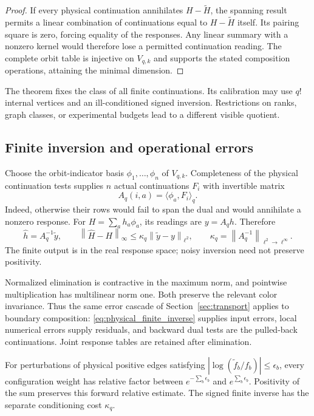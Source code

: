 \documentclass[11pt,a4paper]{amsart}
\numberwithin{equation}{section}
\theoremstyle{definition}
\theoremstyle{remark}
\newcommand{\norm}[1]{\left\lVert#1\right\rVert}
\begin{document}
\begin{proof}
If every physical continuation annihilates $H-\widetilde H$, the spanning result permits a linear combination of continuations equal to $H-\widetilde H$ itself. Its pairing square is zero, forcing equality of the responses. Any linear summary with a nonzero kernel would therefore lose a permitted continuation reading. The complete orbit table is injective on $V_{q,k}$ and supports the stated composition operations, attaining the minimal dimension.
\end{proof}
The theorem fixes the class of all finite continuations. Its calibration may use $q!$ internal vertices and an ill-conditioned signed inversion. Restrictions on ranks, graph classes, or experimental budgets lead to a different visible quotient.

\subsection{Finite inversion and operational errors}
Choose the orbit-indicator basis $\phi_1,\ldots,\phi_n$ of $V_{q,k}$. Completeness of the physical continuation tests supplies $n$ actual continuations $F_i$ with invertible matrix
\[
 A_q(i,a)=\langle\phi_a,F_i\rangle_q.
\]
Indeed, otherwise their rows would fail to span the dual and would annihilate a nonzero response. For $H=\sum_ah_a\phi_a$, its readings are $y=A_qh$. Therefore
\begin{equation}\label{eq:physical_finite_inverse}
 \widehat h=A_q^{-1}\widetilde y,\qquad
 \norm{\widehat H-H}_\infty\le\kappa_q\norm{\widetilde y-y}_{\ell^2},\qquad
 \kappa_q=\norm{A_q^{-1}}_{\ell^2\to\ell^\infty}.
\end{equation}
The finite output is in the real response space; noisy inversion need not preserve positivity.

Normalized elimination is contractive in the maximum norm, and pointwise multiplication has multilinear norm one. Both preserve the relevant color invariance. Thus the same error cascade of Section~\ref{sec:transport} applies to boundary composition: \eqref{eq:physical_finite_inverse} supplies input errors, local numerical errors supply residuals, and backward dual tests are the pulled-back continuations. Joint response tables are retained after elimination.

For perturbations of physical positive edges satisfying
$|\log(\widetilde f_b/f_b)|\le\epsilon_b$,
every configuration weight has relative factor between $e^{-\sum_b\epsilon_b}$ and $e^{\sum_b\epsilon_b}$. Positivity of the sum preserves this forward relative estimate. The signed finite inverse has the separate conditioning cost $\kappa_q$.
\end{document}
